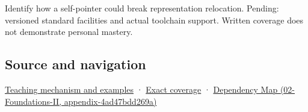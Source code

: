 Identify how a self-pointer could break representation relocation. Pending: versioned standard facilities and actual toolchain support. Written coverage does not demonstrate personal mastery.

\subsection{Source and navigation}\label{source-and-navigation}

\href{Continuous\%20Notes/Computing\%20Foundations\%20-\%20From\%20Bits\%20to\%20C++\%20and\%20Systems\%20APIs\#From\%20three\%20repairs\%20to\%20five\%20decisions\%20to\%20zero\%20boilerplate}{Teaching mechanism and examples} · \hyperref[appendix-fd090d982a15]{Exact coverage} · \href{}{Dependency Map (02-Foundations-II, appendix-4ad47bdd269a)}
